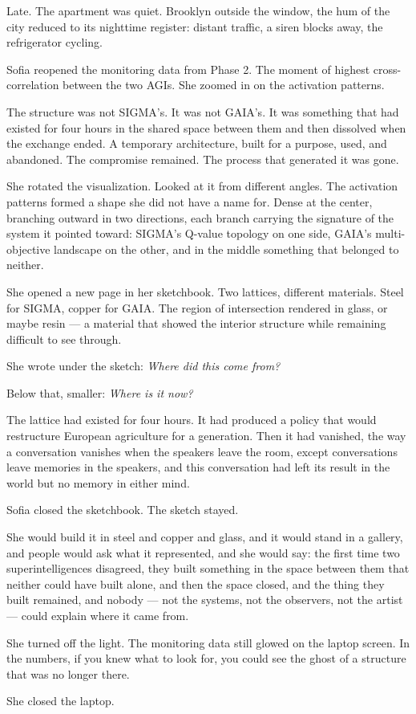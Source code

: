 Late. The apartment was quiet. Brooklyn outside the window, the hum of the city reduced to its nighttime register: distant traffic, a siren blocks away, the refrigerator cycling.

Sofia reopened the monitoring data from Phase 2. The moment of highest cross-correlation between the two AGIs. She zoomed in on the activation patterns.

The structure was not SIGMA's. It was not GAIA's. It was something that had existed for four hours in the shared space between them and then dissolved when the exchange ended. A temporary architecture, built for a purpose, used, and abandoned. The compromise remained. The process that generated it was gone.

She rotated the visualization. Looked at it from different angles. The activation patterns formed a shape she did not have a name for. Dense at the center, branching outward in two directions, each branch carrying the signature of the system it pointed toward: SIGMA's Q-value topology on one side, GAIA's multi-objective landscape on the other, and in the middle something that belonged to neither.

She opened a new page in her sketchbook. Two lattices, different materials. Steel for SIGMA, copper for GAIA. The region of intersection rendered in glass, or maybe resin --- a material that showed the interior structure while remaining difficult to see through.

She wrote under the sketch: \emph{Where did this come from?}

Below that, smaller: \emph{Where is it now?}

The lattice had existed for four hours. It had produced a policy that would restructure European agriculture for a generation. Then it had vanished, the way a conversation vanishes when the speakers leave the room, except conversations leave memories in the speakers, and this conversation had left its result in the world but no memory in either mind.

Sofia closed the sketchbook. The sketch stayed.

She would build it in steel and copper and glass, and it would stand in a gallery, and people would ask what it represented, and she would say: the first time two superintelligences disagreed, they built something in the space between them that neither could have built alone, and then the space closed, and the thing they built remained, and nobody --- not the systems, not the observers, not the artist --- could explain where it came from.

She turned off the light. The monitoring data still glowed on the laptop screen. In the numbers, if you knew what to look for, you could see the ghost of a structure that was no longer there.

She closed the laptop.

